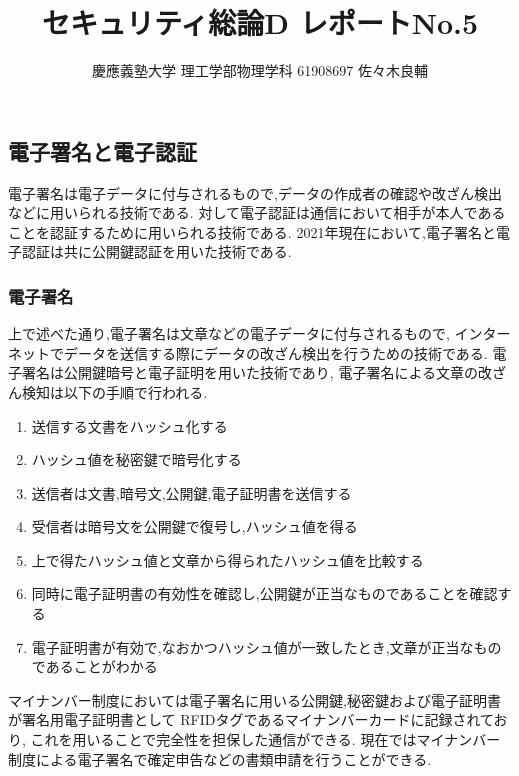 \documentclass[uplatex,a4j,11pt,dvipdfmx]{jsarticle}
\begin{document}
\title{セキュリティ総論D レポートNo.5}
\author{慶應義塾大学 理工学部物理学科 61908697 佐々木良輔}
\date{}
\maketitle
\subsection*{電子署名と電子認証}
電子署名は電子データに付与されるもので,データの作成者の確認や改ざん検出などに用いられる技術である.
対して電子認証は通信において相手が本人であることを認証するために用いられる技術である.
2021年現在において,電子署名と電子認証は共に公開鍵認証を用いた技術である.
\subsubsection*{電子署名}
上で述べた通り,電子署名は文章などの電子データに付与されるもので,
インターネットでデータを送信する際にデータの改ざん検出を行うための技術である.
電子署名は公開鍵暗号と電子証明を用いた技術であり,
電子署名による文章の改ざん検知は以下の手順で行われる.
\begin{enumerate}
  \item 送信する文書をハッシュ化する
  \item ハッシュ値を秘密鍵で暗号化する
  \item 送信者は文書,暗号文,公開鍵,電子証明書を送信する
  \item 受信者は暗号文を公開鍵で復号し,ハッシュ値を得る
  \item 上で得たハッシュ値と文章から得られたハッシュ値を比較する
  \item 同時に電子証明書の有効性を確認し,公開鍵が正当なものであることを確認する
  \item 電子証明書が有効で,なおかつハッシュ値が一致したとき,文章が正当なものであることがわかる
\end{enumerate}

マイナンバー制度においては電子署名に用いる公開鍵,秘密鍵および電子証明書が署名用電子証明書として
RFIDタグであるマイナンバーカードに記録されており,
これを用いることで完全性を担保した通信ができる.
現在ではマイナンバー制度による電子署名で確定申告などの書類申請を行うことができる.\cite{my:online}
\end{document}

